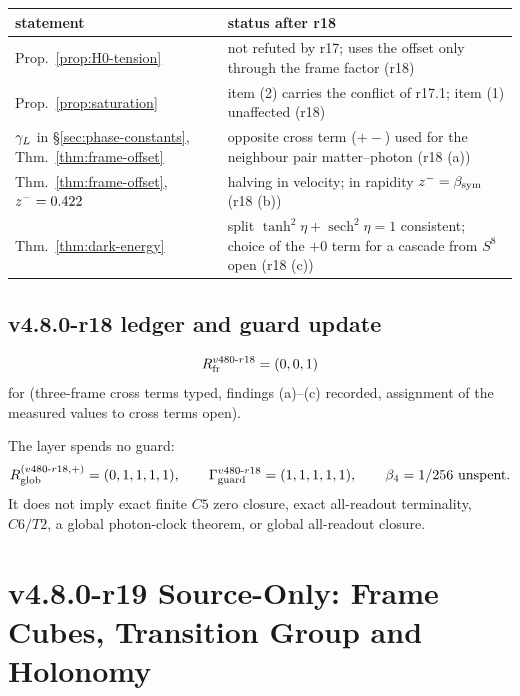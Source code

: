 \begin{center}
\small
\begin{tabular}{@{}>{\raggedright\arraybackslash}p{}>{\raggedright\arraybackslash}p{}@{}}
\toprule
statement & status after r18\\
\midrule
Prop.~\ref{prop:H0-tension} & not refuted by r17; uses the offset only through the frame factor (r18)\\
Prop.~\ref{prop:saturation} & item (2) carries the conflict of r17.1; item (1) unaffected (r18)\\
\(\gamma_L\) in \S\ref{sec:phase-constants}, Thm.~\ref{thm:frame-offset} & opposite cross term (\(+-\)) used for the neighbour pair matter--photon (r18 (a))\\
Thm.~\ref{thm:frame-offset}, \(z^-=0.422\) & halving in velocity; in rapidity \(z^-=\beta_{\mathrm{sym}}\) (r18 (b))\\
Thm.~\ref{thm:dark-energy} & split \(\tanh^2\eta+\operatorname{sech}^2\eta=1\) consistent; choice of the \(+0\) term for a cascade from \(S^8\) open (r18 (c))\\
\bottomrule
\end{tabular}
\end{center}

\subsection*{v4.8.0-r18 ledger and guard update}
\label{subsec:v480-r18-ledger-guard}

\[
R_{\rm fr}^{v480\text{-}r18}=(0,0,1)
\]
for (three-frame cross terms typed, findings (a)--(c) recorded, assignment of the measured values to cross terms
open).

The layer spends no guard:
\[
R_{\rm glob}^{(v480\text{-}r18,+)}=(0,1,1,1,1),
\qquad
\Gamma_{\rm guard}^{v480\text{-}r18}=(1,1,1,1,1),
\qquad
\beta_4=1/256\ \text{unspent}.
\]
It does not imply exact finite \(C5\) zero closure, exact all-readout terminality,
\(C6/T2\), a global photon-clock theorem, or global all-readout closure.

\clearpage
\section*{v4.8.0-r19 Source-Only: Frame Cubes, Transition Group and Holonomy}
\label{sec:v480-r19-frame-cubes-holonomy}

